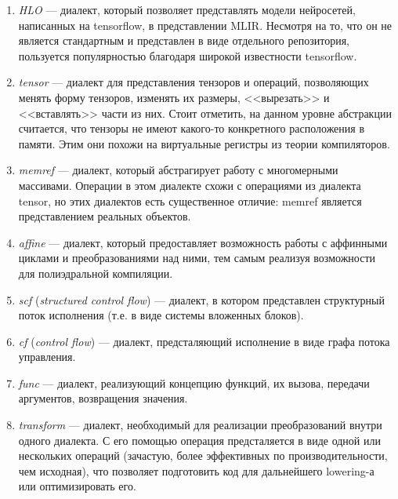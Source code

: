 \begin{enumerate}
    \item \textit{HLO} --- диалект, который позволяет представлять модели
          нейросетей, написанных на tensorflow, в представлении MLIR. Несмотря
          на то, что он не является стандартным и представлен в виде отдельного
          репозитория, пользуется популярностью благодаря широкой
          известности tensorflow.

    \item \textit{tensor} --- диалект для представления тензоров и операций,
          позволяющих менять форму тензоров, изменять их размеры,
          <<вырезать>> и <<вставлять>> части из них. Стоит отметить, на
          данном уровне абстракции считается, что тензоры не имеют какого-то
          конкретного расположения в памяти. Этим они похожи на виртуальные
          регистры из теории компиляторов.

    \item \textit{memref} --- диалект, который абстрагирует работу с многомерными
          массивами. Операции в этом диалекте схожи с операциями из диалекта
          tensor, но этих диалектов есть существенное отличие: memref является
          представлением реальных объектов.

    \item \textit{affine} --- диалект, который предоставляет возможность работы с
          аффинными циклами и преобразованиями над ними, тем самым реализуя
          возможности для полиэдральной компиляции.

    \item \textit{scf} (\textit{structured control flow}) --- диалект, в котором
          представлен структурный поток исполнения (т.е. в виде системы вложенных
          блоков).

    \item \textit{cf} (\textit{control flow}) --- диалект, предсталяющий
          исполнение в виде графа потока управления.

    \item \textit{func} --- диалект, реализующий концепцию функций, их вызова,
          передачи аргументов, возвращения значения.

    \item \textit{transform} --- диалект, необходимый для реализации
          преобразований внутри одного диалекта. С его помощью операция
          предсталяется в виде одной или нескольких операций (зачастую, более
          эффективных по производительности, чем исходная), что позволяет
          подготовить код для дальнейшего lowering-а или оптимизировать его.


\end{enumerate}
